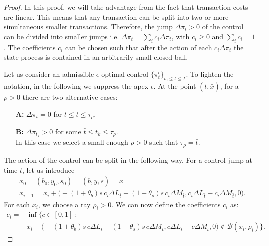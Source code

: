 \begin{proof}
In this proof, we will take advantage from the fact that transaction costs are linear. 
This means that any transaction can be split into two or more simultaneous smaller transactions.
Therefore, the jump $\Delta \pi_t>0$ of the control can be divided into smaller jumps i.e.
$\Delta \pi_t = \sum_i c_i \Delta \pi_t$, with $c_i \geq 0$ and $\sum_i c_i = 1$.
The coefficients $c_i$ can be chosen
such that after the action of each $c_i \Delta \pi_t$ the state process is contained in an arbitrarily small closed ball.  

Let us consider an admissible $\epsilon$-optimal control $\{\pi_t^{\epsilon}\}_{t_0 \leq t \leq T}$.  
To lighten the notation, in the following we suppress the apex $\epsilon$.
At the point $(\bar t,\bar x)$, for a $\rho>0$ there are two alternative cases:
\begin{enumerate}
 \item[\textbf{A:}] $\Delta \pi_t = 0$ for $\bar t \leq t \leq \tau_{\rho}$. 
 \item[\textbf{B:}] $\Delta \pi_{t_k} > 0$ for some $\bar t \leq t_k \leq \tau_{\rho}$.\\
  In this case we select a small enough $\rho > 0$ such that $\tau_{\rho} = \bar t$.
\end{enumerate}
The action of the control can be split in the following way. For a control jump at time $\bar t$, let us introduce %
\begin{align*}
& x_0 = (b_0, y_0, s_0) = (\bar b, \bar y, \bar s) = \bar x \\
& x_{i+1} = x_{i} + \biggl( - (1+\theta_b) \bar s\, c_i  \Delta L_{\bar t} + (1-\theta_s) \bar s\,c_i \Delta M_{\bar t}, c_i \Delta L_{\bar t} - c_i \Delta M_{\bar t}, 0 \biggr).  
\end{align*}
For each $x_i$, we choose a ray $\rho_i>0$. We can now define the coefficients $c_i$ as:
\begin{align}\label{c_i}
 c_i =& \inf \biggl\{ c \in [0,1] \, : \\
 & x_{i} + \biggl( - (1+\theta_b) \bar s\, c  \Delta L_{\bar t} + (1-\theta_s) \bar s\,c \Delta M_{\bar t}, c \Delta L_{\bar t} - c \Delta M_{\bar t}, 0 \biggr)
 \not \in \mathcal{B}(x_i, \rho_i) \biggr\}. 
\end{align}


\end{proof}
